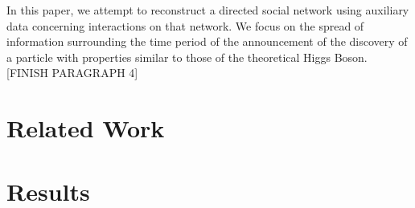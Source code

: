 \documentclass{sig-alternate-10pt}
\begin{document}
In this paper, we attempt to reconstruct a directed social network using auxiliary data concerning interactions on that network.
We focus on the spread of information surrounding the time period of the announcement of the discovery of a particle with properties similar to those of the theoretical Higgs Boson.
[FINISH PARAGRAPH 4]

\section{Related Work}


\section{Results}
\end{document}
